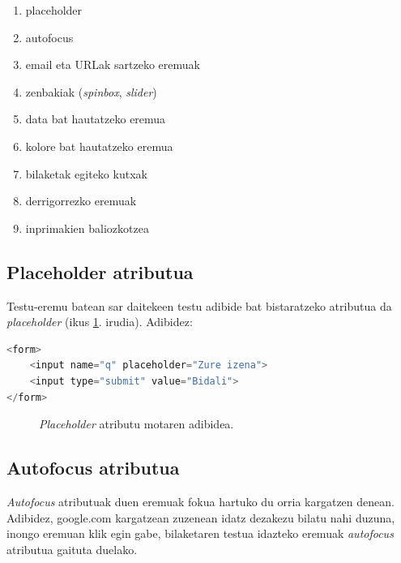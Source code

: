 \begin{enumerate}
    \item placeholder
    \item autofocus
    \item email eta URLak sartzeko eremuak 
    \item zenbakiak (\textit{spinbox}, \textit{slider})
    \item data bat hautatzeko eremua 
    \item kolore bat hautatzeko eremua 
    \item bilaketak egiteko kutxak 
    \item derrigorrezko eremuak 
    \item inprimakien baliozkotzea
\end{enumerate}

\subsection{Placeholder atributua}
 
 Testu-eremu batean sar daitekeen testu adibide bat bistaratzeko atributua da \textit{placeholder} (ikus \ref{fig:placeholder}. irudia). Adibidez:
 
 \begin{lstlisting}[language=JavaScript,numbers=none]
 <form>
    <input name="q" placeholder="Zure izena">    
    <input type="submit" value="Bidali">
</form>
 \end{lstlisting}
 
 \begin{figure}[ht]
	\centering
{}
\caption{\textit{Placeholder} atributu motaren adibidea.}
\label{fig:placeholder}
\end{figure}

 \subsection{Autofocus atributua}
 \textit{Autofocus} atributuak duen eremuak fokua hartuko du orria kargatzen denean. Adibidez, google.com kargatzean zuzenean idatz dezakezu bilatu nahi duzuna, inongo eremuan klik egin gabe, bilaketaren testua idazteko eremuak \textit{autofocus} atributua gaituta duelako.
 
